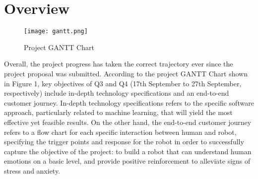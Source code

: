 \section{Overview}

\begin{figure}[ht]
    \centering
    \captionsetup{justification=centering}
    \texttt{[image: gantt.png]}
    \caption{Project GANTT Chart}
    \label{fig:gantt}
\end{figure}
Overall, the project progress has taken the correct trajectory ever since the project proposal was submitted. According to the project GANTT Chart shown in Figure 1, key objectives of Q3 and Q4 (17th September to 27th September, respectively) include in-depth technology specifications and an end-to-end customer journey. In-depth technology specifications refers to the specific software approach, particularly related to machine learning, that will yield the most effective yet feasible results. On the other hand, the end-to-end customer journey refers to a flow chart for each specific interaction between human and robot, specifying the trigger points and response for the robot in order to successfully capture the objective of the project: to build a robot that can understand human emotions on a basic level, and provide positive reinforcement to alleviate signs of stress and anxiety. 